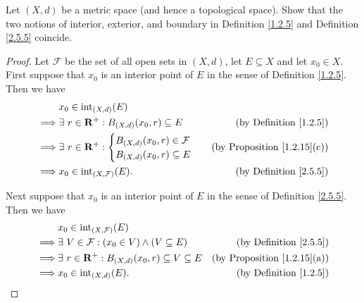 \begin{exercise}\label{ex 2.5.3}
    Let \((X, d)\) be a metric space (and hence a topological space).
    Show that the two notions of interior, exterior, and boundary in Definition
    \ref{1.2.5} and Definition \ref{2.5.5} coincide.
\end{exercise}

\begin{proof}
    Let \(\mathcal{F}\) be the set of all open sets in \((X, d)\), let \(E \subseteq X\) and let \(x_0 \in X\).
    First suppose that \(x_0\) is an interior point of \(E\) in the sense of Definition \ref{1.2.5}.
    Then we have
    \begin{align*}
                 & x_0 \in \text{int}_{(X, d)}(E)                                                             \\
        \implies & \exists\ r \in \mathbf{R}^+ : B_{(X, d)}(x_0, r) \subseteq E & \text{(by Definition \ref{1.2.5})}  \\
        \implies & \exists\ r \in \mathbf{R}^+ : \begin{cases}
                                             B_{(X, d)}(x_0, r) \in \mathcal{F} \\
                                             B_{(X, d)}(x_0, r) \subseteq E
                                         \end{cases}                & \text{(by Proposition \ref{1.2.15}(c))} \\
        \implies & x_0 \in \text{int}_{(X, \mathcal{F})}(E).            & \text{(by Definition \ref{2.5.5})}
    \end{align*}

    Next suppose that \(x_0\) is an interior point of \(E\) in the sense of Definition \ref{2.5.5}.
    Then we have
    \begin{align*}
                 & x_0 \in \text{int}_{(X, \mathcal{F})}(E)                                                                   \\
        \implies & \exists\ V \in \mathcal{F} : (x_0 \in V) \land (V \subseteq E)   & \text{(by Definition \ref{2.5.5})}      \\
        \implies & \exists\ r \in \mathbf{R}^+ : B_{(X, d)}(x_0, r) \subseteq V \subseteq E & \text{(by Proposition \ref{1.2.15}(a))} \\
        \implies & x_0 \in \text{int}_{(X, d)}(E).                                  & \text{(by Definition \ref{1.2.5})}
    \end{align*}


\end{proof}
